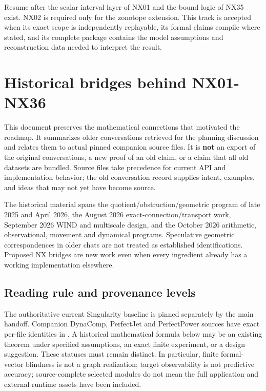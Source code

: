 \documentclass[
  11pt,
  a4paper,
]{report}
\let\nxtexttt\texttt
\renewcommand{\texttt}[1]{\nxtexttt{\seqsplit{#1}}}
\begin{document}
Resume after the scalar interval layer of NX01 and the bound logic of
NX35 exist. NX02 is required only for the zonotope extension. This track
is accepted when its exact scope is independently replayable, its formal
claims compile where stated, and its complete package contains the model
assumptions and reconstruction data needed to interpret the result.

\hypertarget{historical-bridges-behind-nx01-nx36}{%
\chapter{Historical bridges behind
NX01-NX36}\label{historical-bridges-behind-nx01-nx36}}

This document preserves the mathematical connections that motivated the
roadmap. It summarizes older conversations retrieved for the planning
discussion and relates them to actual pinned companion source files. It
is \textbf{not} an export of the original conversations, a new proof of
an old claim, or a claim that all old datasets are bundled. Source files
take precedence for current API and implementation behavior; the old
conversation record supplies intent, examples, and ideas that may not
yet have become source.

The historical material spans the quotient/obstruction/geometric program
of late 2025 and April 2026, the August 2026 exact-connection/transport
work, September 2026 WIND and multiscale design, and the October 2026
arithmetic, observational, movement and dynamical programs. Speculative
geometric correspondences in older chats are not treated as established
identifications. Proposed NX bridges are new work even when every
ingredient already has a working implementation elsewhere.

\hypertarget{reading-rule-and-provenance-levels}{%
\section{Reading rule and provenance
levels}\label{reading-rule-and-provenance-levels}}

The authoritative current Singularity baseline is pinned separately by
the main handoff. Companion DynaComp, PerfectJet and PerfectPower
sources have exact per-file identities in
\texttt{COMPANION\_SOURCES.json}. A historical mathematical formula
below may be an existing theorem under specified assumptions, an exact
finite experiment, or a design suggestion. These statuses must remain
distinct. In particular, finite formal-vector blindness is not a graph
realization; target observability is not predictive accuracy;
source-complete selected modules do not mean the full application and
external runtime assets have been included.
\end{document}
